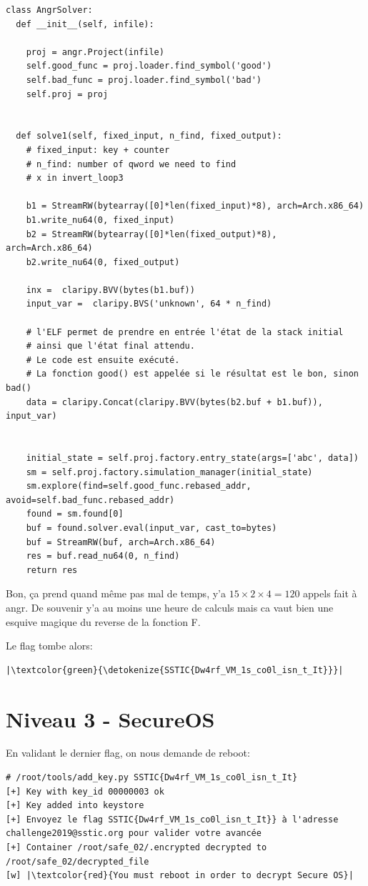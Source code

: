 \documentclass[14pt]{article}
\theoremstyle{definition}
\begin{document}
\begin{verbatim}
class AngrSolver:
  def __init__(self, infile):

    proj = angr.Project(infile)
    self.good_func = proj.loader.find_symbol('good')
    self.bad_func = proj.loader.find_symbol('bad')
    self.proj = proj


  def solve1(self, fixed_input, n_find, fixed_output):
    # fixed_input: key + counter
    # n_find: number of qword we need to find
    # x in invert_loop3

    b1 = StreamRW(bytearray([0]*len(fixed_input)*8), arch=Arch.x86_64)
    b1.write_nu64(0, fixed_input)
    b2 = StreamRW(bytearray([0]*len(fixed_output)*8), arch=Arch.x86_64)
    b2.write_nu64(0, fixed_output)

    inx =  claripy.BVV(bytes(b1.buf))
    input_var =  claripy.BVS('unknown', 64 * n_find)

    # l'ELF permet de prendre en entrée l'état de la stack initial
    # ainsi que l'état final attendu.
    # Le code est ensuite exécuté.
    # La fonction good() est appelée si le résultat est le bon, sinon bad()
    data = claripy.Concat(claripy.BVV(bytes(b2.buf + b1.buf)), input_var)


    initial_state = self.proj.factory.entry_state(args=['abc', data])
    sm = self.proj.factory.simulation_manager(initial_state)
    sm.explore(find=self.good_func.rebased_addr, avoid=self.bad_func.rebased_addr)
    found = sm.found[0]
    buf = found.solver.eval(input_var, cast_to=bytes)
    buf = StreamRW(buf, arch=Arch.x86_64)
    res = buf.read_nu64(0, n_find)
    return res

\end{verbatim}

Bon, ça prend quand même pas mal de temps, y'a $15 \times 2 \times4 = 120$ appels fait à angr. De souvenir y'a au moins une heure de calculs mais ca vaut bien une esquive magique du reverse de la fonction F.


Le flag tombe alors:
\begin{verbatim}
|\textcolor{green}{\detokenize{SSTIC{Dw4rf_VM_1s_co0l_isn_t_It}}}|
\end{verbatim}

\pagebreak
\section{Niveau 3 - SecureOS}

En validant le dernier flag, on nous demande de reboot:
\begin{verbatim}
# /root/tools/add_key.py SSTIC{Dw4rf_VM_1s_co0l_isn_t_It}
[+] Key with key_id 00000003 ok
[+] Key added into keystore
[+] Envoyez le flag SSTIC{Dw4rf_VM_1s_co0l_isn_t_It}} à l'adresse challenge2019@sstic.org pour valider votre avancée
[+] Container /root/safe_02/.encrypted decrypted to /root/safe_02/decrypted_file
[w] |\textcolor{red}{You must reboot in order to decrypt Secure OS}|
\end{verbatim}
\end{document}
